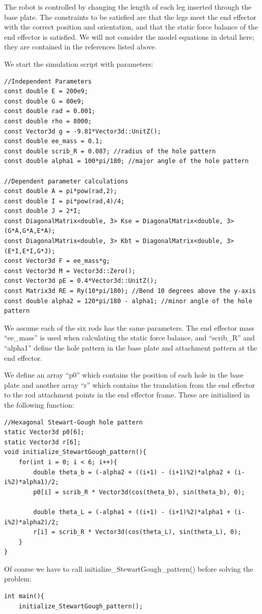 \documentclass[12pt]{article}
\begin{document}
The robot is controlled by changing the length of each leg inserted through the base plate. The constraints to be satisfied are that the legs meet the end effector with the correct position and orientation, and that the static force balance of the end effector is satisfied. We will not consider the model equations in detail here; they are contained in the references listed above.

\newpage
We start the simulation script with parameters:
\begin{lstlisting}
//Independent Parameters
const double E = 200e9;
const double G = 80e9;
const double rad = 0.001;
const double rho = 8000;
const Vector3d g = -9.81*Vector3d::UnitZ();
const double ee_mass = 0.1;
const double scrib_R = 0.087; //radius of the hole pattern
const double alpha1 = 100*pi/180; //major angle of the hole pattern

//Dependent parameter calculations
const double A = pi*pow(rad,2);
const double I = pi*pow(rad,4)/4;
const double J = 2*I;
const DiagonalMatrix<double, 3> Kse = DiagonalMatrix<double, 3>(G*A,G*A,E*A);
const DiagonalMatrix<double, 3> Kbt = DiagonalMatrix<double, 3>(E*I,E*I,G*J);
const Vector3d F = ee_mass*g;
const Vector3d M = Vector3d::Zero();
const Vector3d pE = 0.4*Vector3d::UnitZ();
const Matrix3d RE = Ry(10*pi/180); //Bend 10 degrees above the y-axis
const double alpha2 = 120*pi/180 - alpha1; //minor angle of the hole pattern
\end{lstlisting}
We assume each of the six rods has the same parameters. The end effector mass ``ee\_mass'' is used when calculating the static force balance, and ``scrib\_R'' and ``alpha1'' define the hole pattern in the base plate and attachment pattern at the end effector.

We define an array ``p0'' which contains the position of each hole in the base plate and another array ``r'' which contains the translation from the end effector to the rod attachment points in the end effector frame. These are initialized in the following function:
\begin{lstlisting}
//Hexagonal Stewart-Gough hole pattern
static Vector3d p0[6];
static Vector3d r[6];
void initialize_StewartGough_pattern(){
    for(int i = 0; i < 6; i++){
        double theta_b = (-alpha2 + ((i+1) - (i+1)%2)*alpha2 + (i-i%2)*alpha1)/2;
        p0[i] = scrib_R * Vector3d(cos(theta_b), sin(theta_b), 0);

        double theta_L = (-alpha1 + ((i+1) - (i+1)%2)*alpha1 + (i-i%2)*alpha2)/2;
        r[i] = scrib_R * Vector3d(cos(theta_L), sin(theta_L), 0);
    }
}
\end{lstlisting}
Of course we have to call initialize\_StewartGough\_pattern() before solving the problem:
\begin{lstlisting}
int main(){
    initialize_StewartGough_pattern();
\end{lstlisting}
\end{document}
